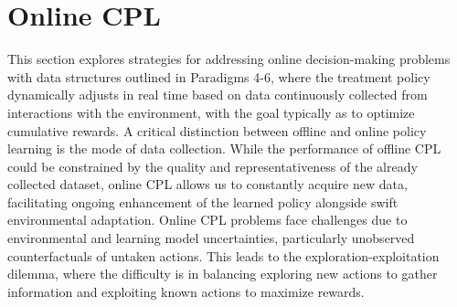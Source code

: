 \section{Online \acrlong{CPL}}\label{sec:Online CPL}

This section explores strategies for addressing online decision-making problems with data structures outlined in Paradigms 4-6, where the treatment policy dynamically adjusts in real time based on data continuously collected from interactions with the environment, with the goal typically as to optimize cumulative rewards. 
A critical distinction between offline and online policy learning is the mode of data collection. While the performance of offline \acrshort{CPL} could be constrained by the quality and representativeness of the already collected dataset, online \acrshort{CPL} allows us to constantly acquire new data, facilitating ongoing enhancement of the learned policy alongside swift environmental adaptation. 
Online \acrshort{CPL} problems face challenges due to environmental and learning model uncertainties, particularly unobserved counterfactuals of untaken actions. This leads to the exploration-exploitation dilemma, where the difficulty is in balancing exploring new actions to gather information and exploiting known actions to maximize rewards. 


